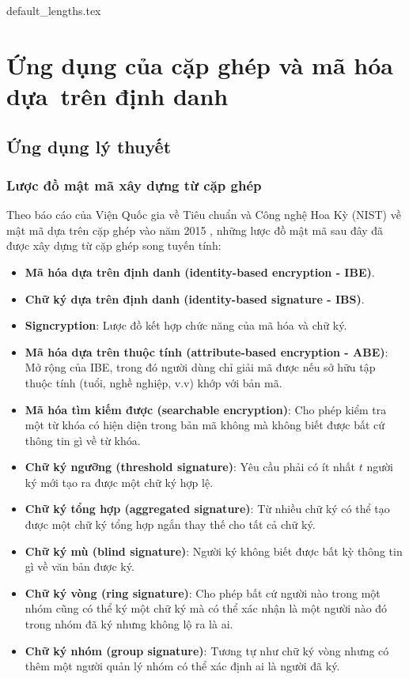 \documentclass[class=report, crop=false]{standalone}
\begin{document}
	{default_lengths.tex}
	\chapter{Ứng dụng của cặp ghép và mã hóa dựa~trên định danh}\label{chap:6}
	\section{Ứng dụng lý thuyết}
		\subsection{Lược đồ mật mã xây dựng từ cặp ghép}
			Theo báo cáo của Viện Quốc gia về Tiêu chuẩn và Công nghệ Hoa Kỳ (NIST) về mật mã dựa trên cặp ghép vào năm 2015 \cite{nist_report}, những lược đồ mật mã sau đây đã được xây dựng từ cặp ghép song tuyến tính:
			\vspace{-0.5\baselineskip}
			\begin{itemize}
				\item \textbf{Mã hóa dựa trên định danh (identity-based encryption - IBE)}.
				\item \textbf{Chữ ký dựa trên định danh (identity-based signature - IBS)}.
				\item \textbf{Signcryption}: Lược đồ kết hợp chức năng của mã hóa và chữ ký.
				\item \textbf{Mã hóa dựa trên thuộc tính (attribute-based encryption - ABE)}: Mở rộng của IBE, trong đó người dùng chỉ giải mã được nếu sở hữu tập thuộc tính (tuổi, nghề nghiệp, v.v) khớp với bản mã.
				\item \textbf{Mã hóa tìm kiếm được (searchable encryption)}: Cho phép kiểm tra một từ khóa có hiện diện trong bản mã không mà không biết được bất cứ thông tin gì về từ khóa.
				\item \textbf{Chữ ký ngưỡng (threshold signature)}: Yêu cầu phải có ít nhất $t$ người ký mới tạo ra được một chữ ký hợp lệ.
				\item \textbf{Chữ ký tổng hợp (aggregated signature)}: Từ nhiều chữ ký có thể tạo được một chữ ký tổng hợp ngắn thay thế cho tất cả chữ ký.
				\item \textbf{Chữ ký mù (blind signature)}: Người ký không biết được bất kỳ thông tin gì về văn bản được ký.
				\item \textbf{Chữ ký vòng (ring signature)}: Cho phép bất cứ người nào trong một nhóm cũng có thể ký một chữ ký mà có thể xác nhận là một người nào đó trong nhóm đã ký nhưng không lộ ra là ai.
				\item \textbf{Chữ ký nhóm (group signature)}: Tương tự như chữ ký vòng nhưng có thêm một người quản lý nhóm có thể xác định ai là người đã ký.
			\end{itemize}
\end{document}
